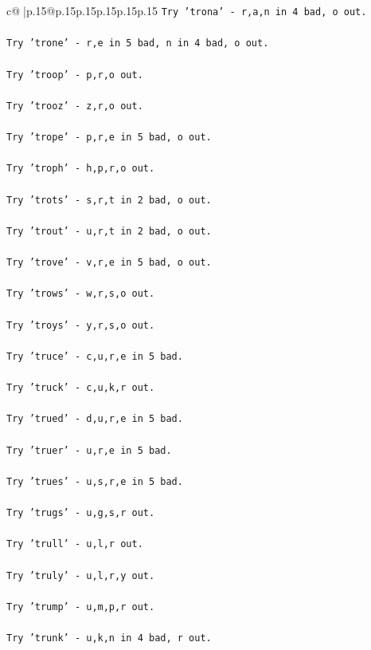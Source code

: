 \documentclass{article}
\begin{document}
{\begin{supertabular}{c@{$\;$}|p{.15\linewidth}@{}p{.15\linewidth}p{.15\linewidth}p{.15\linewidth}p{.15\linewidth}p{.15\linewidth}}
{{{\texttt{Try 'trona' {-} r,a,n in 4 bad, o out.} \\
\\ 
\texttt{Try 'trone' {-} r,e in 5 bad, n in 4 bad, o out.} \\
\\ 
\texttt{Try 'troop' {-} p,r,o out.} \\
\\ 
\texttt{Try 'trooz' {-} z,r,o out.} \\
\\ 
\texttt{Try 'trope' {-} p,r,e in 5 bad, o out.} \\
\\ 
\texttt{Try 'troph' {-} h,p,r,o out.} \\
\\ 
\texttt{Try 'trots' {-} s,r,t in 2 bad, o out.} \\
\\ 
\texttt{Try 'trout' {-} u,r,t in 2 bad, o out.} \\
\\ 
\texttt{Try 'trove' {-} v,r,e in 5 bad, o out.} \\
\\ 
\texttt{Try 'trows' {-} w,r,s,o out.} \\
\\ 
\texttt{Try 'troys' {-} y,r,s,o out.} \\
\\ 
\texttt{Try 'truce' {-} c,u,r,e in 5 bad.} \\
\\ 
\texttt{Try 'truck' {-} c,u,k,r out.} \\
\\ 
\texttt{Try 'trued' {-} d,u,r,e in 5 bad.} \\
\\ 
\texttt{Try 'truer' {-} u,r,e in 5 bad.} \\
\\ 
\texttt{Try 'trues' {-} u,s,r,e in 5 bad.} \\
\\ 
\texttt{Try 'trugs' {-} u,g,s,r out.} \\
\\ 
\texttt{Try 'trull' {-} u,l,r out.} \\
\\ 
\texttt{Try 'truly' {-} u,l,r,y out.} \\
\\ 
\texttt{Try 'trump' {-} u,m,p,r out.} \\
\\ 
\texttt{Try 'trunk' {-} u,k,n in 4 bad, r out.} \\
}}}
\end{supertabular}}
\end{document}
